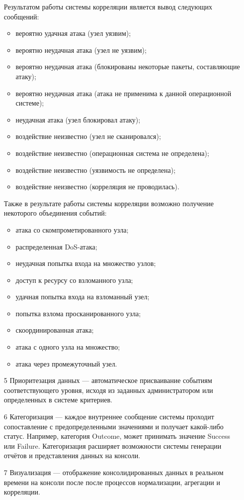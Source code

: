 \begin{enumerate}
   
    Результатом работы системы корреляции является вывод следующих сообщений:
    \begin{itemize}
        \item вероятно удачная атака (узел уязвим);
        \item вероятно неудачная атака (узел не уязвим);
        \item вероятно неудачная атака (блокированы некоторые пакеты, составляющие атаку);
        \item вероятно неудачная атака (атака не применима к данной операционной системе);
        \item неудачная атака (узел блокировал атаку);
        \item воздействие неизвестно (узел не сканировался);
        \item воздействие неизвестно (операционная система не определена);
        \item воздействие неизвестно (уязвимость не определена);
        \item воздействие неизвестно (корреляция не проводилась).
    \end{itemize}
    
    Также в результате работы системы корреляции возможно получение некоторого объединения событий:
    \begin{itemize}
        \item атака со скомпрометированного узла;
        \item распределенная DoS-атака;
        \item неудачная попытка входа на множество узлов;
        \item доступ к ресурсу со взломанного узла;
        \item удачная попытка входа на взломанный узел;
        \item попытка взлома просканированного узла;
        \item скоординированная атака;
        \item атака с одного узла на множество;
        \item атака через промежуточный узел.
    \end{itemize}
    
    \item[5] Приоритезация данных --- автоматическое присваивание событиям соответствующего уровня, исходя из заданных администратором или определенных в системе критериев.
    \item[6] Категоризация --- каждое внутреннее сообщение системы проходит сопоставление с предопределенными значениями и получает какой-либо статус. Например, категория Outcome, может принимать значение Success или Failure.
    Категоризация расширяет возможности системы генерации отчётов и представления данных на консоли.
    \item[7] Визуализация --- отображение консолидированных данных в реальном времени на консоли после после процессов нормализации, агрегации и корреляции.
\end{enumerate}

